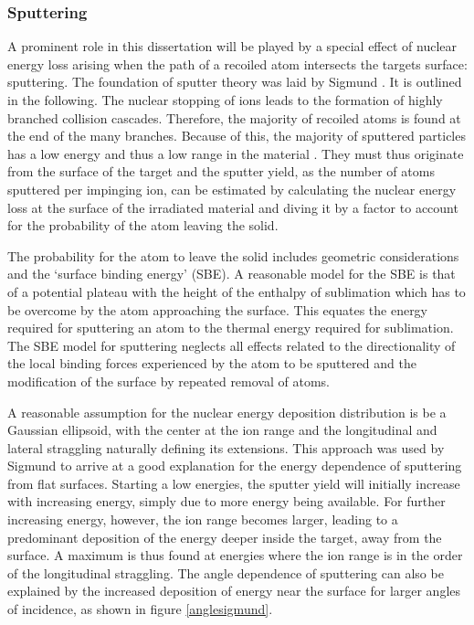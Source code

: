 \subsubsection{Sputtering}

A prominent role in this dissertation will be played by a special effect of nuclear energy loss arising when the path of a recoiled atom intersects the targets surface: sputtering. The foundation of sputter theory was laid by Sigmund \cite{sigmund_theory_1969}. It is outlined in the following. The nuclear stopping of ions leads to the formation of highly branched collision cascades. Therefore, the majority of recoiled atoms is found at the end of the many branches. Because of this, the majority of sputtered particles has a low energy and thus a low range in the material \cite{thompson_energy_1968}. They must thus originate from the surface of the target and the sputter yield, as the number of atoms sputtered per impinging ion, can be estimated by calculating the nuclear energy loss at the surface of the irradiated material and diving it by a factor to account for the probability of the atom leaving the solid. 

The probability for the atom to leave the solid includes geometric considerations and the `surface binding energy' (SBE). A reasonable model for the SBE is that of a potential plateau with the height of the enthalpy of sublimation which has to be overcome by the atom approaching the surface. This equates the energy required for sputtering an atom to the thermal energy required for sublimation. The SBE model for sputtering neglects all effects related to the directionality of the local binding forces experienced by the atom to be sputtered and the modification of the surface by repeated removal of atoms.

A reasonable assumption for the nuclear energy deposition distribution is be a Gaussian ellipsoid, with the center at the ion range and the longitudinal and lateral straggling naturally defining its extensions. This approach was used by Sigmund to arrive at a good explanation for the energy dependence of sputtering from flat surfaces. Starting a low energies, the sputter yield will initially increase with increasing energy, simply due to more energy being available. For further increasing energy, however, the ion range becomes larger, leading to a predominant deposition of the energy deeper inside the target, away from the surface. A maximum is thus found at energies where the ion range is in the order of the longitudinal straggling. The angle dependence of sputtering can also be explained by the increased deposition of energy near the surface for larger angles of incidence, as shown in figure \ref{anglesigmund}.

